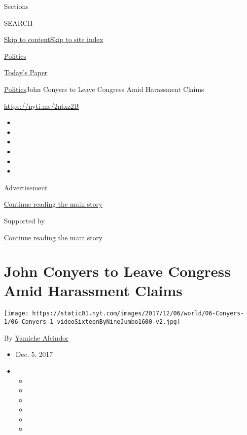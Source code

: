 Sections

SEARCH

\protect\hyperlink{site-content}{Skip to
content}\protect\hyperlink{site-index}{Skip to site index}

\href{https://www.nytimes.com/section/politics}{Politics}

\href{https://myaccount.nytimes.com/auth/login?response_type=cookie\&client_id=vi}{}

\href{https://www.nytimes.com/section/todayspaper}{Today's Paper}

\href{/section/politics}{Politics}\textbar{}John Conyers to Leave
Congress Amid Harassment Claims

\url{https://nyti.ms/2ntxz2B}

\begin{itemize}
\item
\item
\item
\item
\item
\item
\end{itemize}

Advertisement

\protect\hyperlink{after-top}{Continue reading the main story}

Supported by

\protect\hyperlink{after-sponsor}{Continue reading the main story}

\hypertarget{john-conyers-to-leave-congress-amid-harassment-claims}{%
\section{John Conyers to Leave Congress Amid Harassment
Claims}\label{john-conyers-to-leave-congress-amid-harassment-claims}}

\texttt{[image: https://static01.nyt.com/images/2017/12/06/world/06-Conyers-1/06-Conyers-1-videoSixteenByNineJumbo1600-v2.jpg]}

By \href{http://www.nytimes.com/by/yamiche-alcindor}{Yamiche Alcindor}

\begin{itemize}
\item
  Dec. 5, 2017
\item
  \begin{itemize}
  \item
  \item
  \item
  \item
  \item
  \item
  \end{itemize}
\end{itemize}

